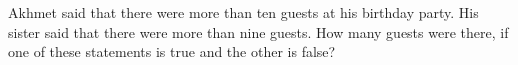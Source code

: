 Akhmet said that there were more than ten guests at his birthday party. His sister said that there were more than nine guests. How many guests were there, if one of these statements is true and the other is false?

